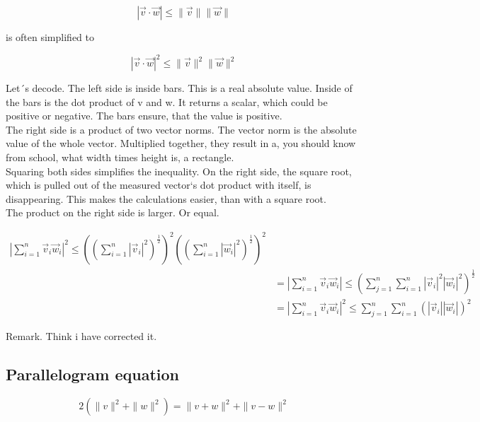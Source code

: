 \documentclass[a4paper]{article}
\begin{document}
\begin{displaymath}
    |\vec{v}\cdot\vec{w}| \leq \|\vec{v}\|\|\vec{w}\|
\end{displaymath}

is often simplified to

\begin{displaymath}
    |\vec{v}\cdot\vec{w}|^{2} \leq \|\vec{v}\|^{2}\|\vec{w}\|^{2}
\end{displaymath}

Let´s decode. The left side is inside bars. This is a real absolute value. Inside of the bars is the dot product of v and w. It returns a scalar, which could be positive or negative. The bars ensure, that the value is positive.\\

The right side is a product of two vector norms. The vector norm is the absolute value of the whole vector. Multiplied together, they result in a, you should know from school, what width times height is, a rectangle. \\

Squaring both sides simplifies the inequality. On the right side, the square root, which is pulled out of the measured vector`s dot product with itself, is disappearing. This makes the calculations easier, than with a square root.\\

The product on the right side is larger. Or equal. 

\begin{displaymath}
\begin{align}    
    |\sum_{i=1}^{n}\vec{v}_{i}\vec{w}_{i}|^{2} \leq ((\sum_{i=1}^{n}|\vec{v}_{i}|^{2})^{\frac{1}{2}})^{2}((\sum_{i=1}^{n}|\vec{w}_{i}|^{2})^{\frac{1}{2}})^{2}\\
    &= |\sum_{i=1}^{n}\vec{v}_{i}\vec{w}_{i}| \leq (\sum_{j=1}^{n}\sum_{i=1}^{n}|\vec{v}_{i}|^{2}|\vec{w}_{i}|^{2})^{\frac{1}{2}}\\
&=
|\sum_{i=1}^{n}\vec{v}_{i}\vec{w}_{i}|^{2} \leq \sum_{j=1}^{n}\sum_{i=1}^{n}(|\vec{v}_{i}||\vec{w}_{i}|)^{2}
\end{align}
\end{displaymath}

Remark. Think i have corrected it.

\subsection{Parallelogram equation}

\begin{displaymath}
2(\|v\|^{2} + \|w\|^{2}) = \|v+w\|^{2}+\|v-w\|^{2}
\end{displaymath}
\end{document}
